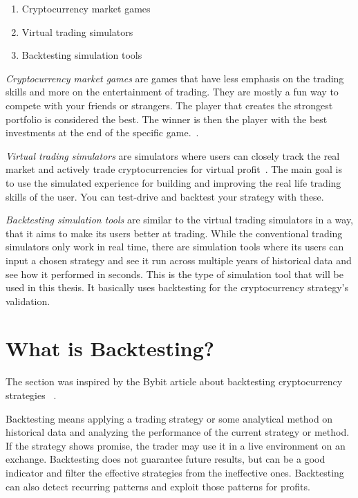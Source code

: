 \begin{enumerate}
    \item Cryptocurrency market games
    \item Virtual trading simulators
    \item Backtesting simulation tools
\end{enumerate}

\emph{Cryptocurrency market games} are games that have less emphasis on the trading skills and more on the entertainment of trading. They are mostly a fun way to compete with your friends or strangers. The player that creates the strongest portfolio is considered the best. The winner is then the player with the best investments at the end of the specific game.~\cite{top-stocks-crypto-trading-simulators}.

\emph{Virtual trading simulators} are simulators where users can closely track the real market and actively trade cryptocurrencies for virtual profit~\cite{top-stocks-crypto-trading-simulators}. The main goal is to use the simulated experience for building and improving the real life trading skills of the user. You can test-drive and backtest your strategy with these.

\emph{Backtesting simulation tools} are similar to the virtual trading simulators in a way, that it aims to make its users better at trading. While the conventional trading simulators only work in real time, there are simulation tools where its users can input a chosen strategy and see it run across multiple years of historical data and see how it performed in seconds. This is the type of simulation tool that will be used in this thesis. It basically uses backtesting for the cryptocurrency strategy's validation.

\section{What is Backtesting?}
The section was inspired by the Bybit article about backtesting cryptocurrency strategies ~\cite{backtesting-crypto-trading-strategies}.

Backtesting means applying a trading strategy or some analytical method on historical data and analyzing the performance of the current strategy or method. If the strategy shows promise, the trader may use it in a live environment on an exchange. Backtesting does not guarantee future results, but can be a good indicator and filter the effective strategies from the ineffective ones. Backtesting can also detect recurring patterns and exploit those patterns for profits.


